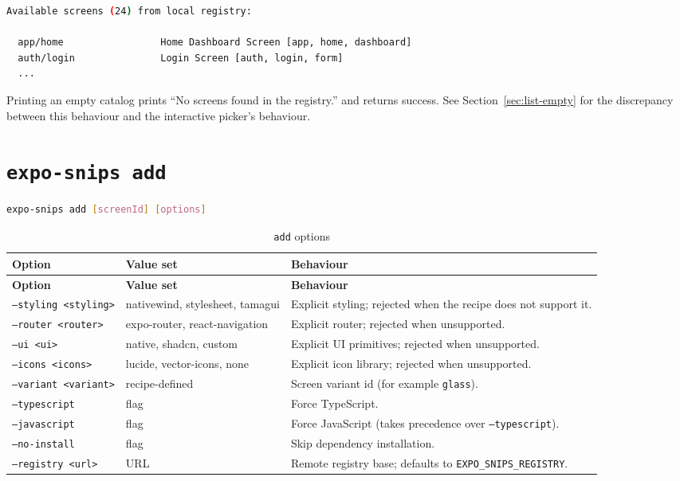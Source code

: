 \begin{lstlisting}[language=bash]
Available screens (24) from local registry:

  app/home                 Home Dashboard Screen [app, home, dashboard]
  auth/login               Login Screen [auth, login, form]
  ...
\end{lstlisting}

Printing an empty catalog prints ``No screens found in the registry.'' and returns
success. See Section~\ref{sec:list-empty} for the discrepancy between this
behaviour and the interactive picker's behaviour.

\section{\texttt{expo-snips add}}

\begin{lstlisting}[language=bash]
expo-snips add [screenId] [options]
\end{lstlisting}

\begin{longtable}{@{}L{3.4cm}L{2.9cm}L{8.5cm}@{}}
\caption{\texttt{add} options}\\
\toprule
\textbf{Option} & \textbf{Value set} & \textbf{Behaviour} \\
\midrule
\endfirsthead
\toprule
\textbf{Option} & \textbf{Value set} & \textbf{Behaviour} \\
\midrule
\endhead
\texttt{--styling <styling>} & nativewind, stylesheet, tamagui & Explicit styling; rejected when the recipe does not support it. \\
\texttt{--router <router>} & expo-router, react-navigation & Explicit router; rejected when unsupported. \\
\texttt{--ui <ui>} & native, shadcn, custom & Explicit UI primitives; rejected when unsupported. \\
\texttt{--icons <icons>} & lucide, vector-icons, none & Explicit icon library; rejected when unsupported. \\
\texttt{--variant <variant>} & recipe-defined & Screen variant id (for example \texttt{glass}). \\
\texttt{--typescript} & flag & Force TypeScript. \\
\texttt{--javascript} & flag & Force JavaScript (takes precedence over \texttt{--typescript}). \\
\texttt{--no-install} & flag & Skip dependency installation. \\
\texttt{--registry <url>} & URL & Remote registry base; defaults to \texttt{EXPO\_SNIPS\_REGISTRY}. \\
\bottomrule
\end{longtable}

